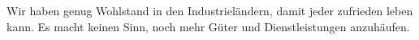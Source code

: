 Wir haben genug Wohlstand in den Industrieländern, damit jeder zufrieden leben kann.
Es macht keinen Sinn, noch mehr Güter und Dienstleistungen anzuhäufen.
